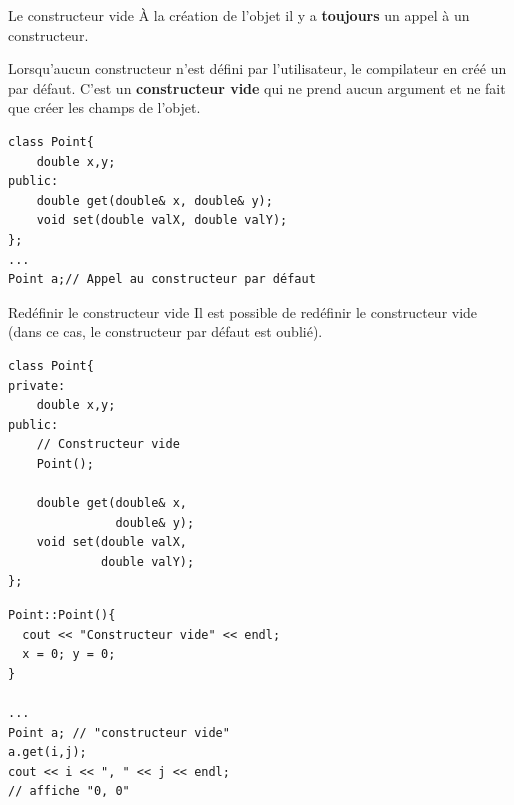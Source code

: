 \begin{frame}[fragile=singleslide]{Le constructeur vide}
    À la création de l'objet il y a \textbf{toujours} un appel à un constructeur.

    Lorsqu'aucun constructeur n'est défini par l'utilisateur, le compilateur en créé un par défaut.
    C'est un \textbf{constructeur vide} qui ne prend aucun argument et ne fait que créer les champs de l'objet.
        \begin{verbatim}
class Point{
    double x,y;
public:
    double get(double& x, double& y);
    void set(double valX, double valY);
};
...
Point a;// Appel au constructeur par défaut
        \end{verbatim}
    
\end{frame}

\begin{frame}[fragile=singleslide]{Redéfinir le constructeur vide}
    Il est possible de redéfinir le constructeur vide (dans ce cas, le constructeur par défaut est oublié).\\
    \begin{minipage}{0.44\linewidth}
            \begin{verbatim}
class Point{
private:
    double x,y;
public:
    // Constructeur vide
    Point();

    double get(double& x,
               double& y);
    void set(double valX,
             double valY);
};
            \end{verbatim} 
    \end{minipage}
    \hfill
    \begin{minipage}{0.52\linewidth}
            \begin{verbatim}
Point::Point(){
  cout << "Constructeur vide" << endl;
  x = 0; y = 0;
}

...
Point a; // "constructeur vide"
a.get(i,j);
cout << i << ", " << j << endl;
// affiche "0, 0"
            \end{verbatim}
    \end{minipage}
\end{frame}

